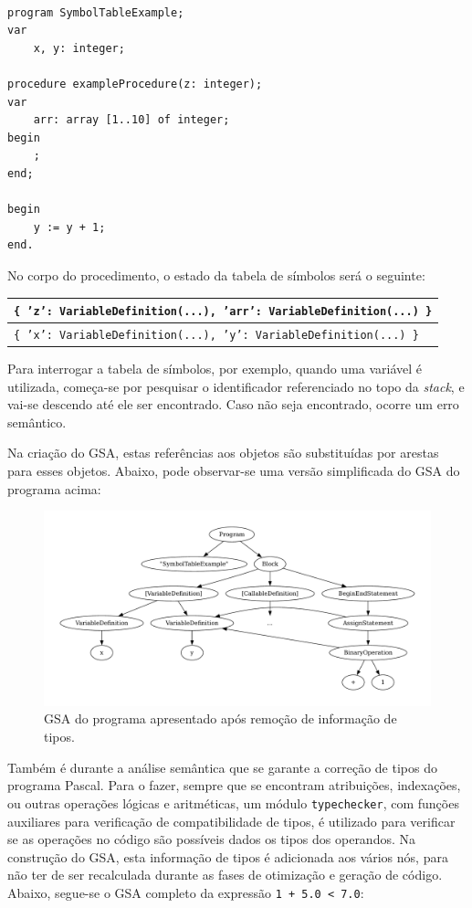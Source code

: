 \documentclass[12pt, a4paper]{article}
\begin{document}
\lstset{
    language=pascal
}

\begin{lstlisting}

program SymbolTableExample;
var
    x, y: integer;

procedure exampleProcedure(z: integer);
var
    arr: array [1..10] of integer;
begin
    ;
end;

begin
    y := y + 1;
end.
\end{lstlisting}

No corpo do procedimento, o estado da tabela de símbolos será o seguinte:

\begin{tabular}{|>{\centering\arraybackslash}p{\textwidth}|}
    \hline
    \texttt{\{ 'z': VariableDefinition(...), 'arr': VariableDefinition(...) \}} \\
    \hline
    \texttt{\{ 'x': VariableDefinition(...), 'y': VariableDefinition(...) \}} \\
    \hline
\end{tabular}

Para interrogar a tabela de símbolos, por exemplo, quando uma variável é utilizada, começa-se por
pesquisar o identificador referenciado no topo da \emph{stack}, e vai-se descendo até ele ser
encontrado. Caso não seja encontrado, ocorre um erro semântico.

Na criação do GSA, estas referências aos objetos são substituídas por arestas para esses objetos.
Abaixo, pode observar-se uma versão simplificada do GSA do programa acima:

\begin{figure}[H]
    \centering
    \includegraphics[width=\textwidth]{res/variable-reference.pdf}
    \caption{GSA do programa apresentado após remoção de informação de tipos.}
\end{figure}

Também é durante a análise semântica que se garante a correção de tipos do programa Pascal. Para o
fazer, sempre que se encontram atribuições, indexações, ou outras operações lógicas e aritméticas,
um módulo \texttt{typechecker}, com funções auxiliares para verificação de compatibilidade de tipos,
é utilizado para verificar se as operações no código são possíveis dados os tipos dos operandos.
Na construção do GSA, esta informação de tipos é adicionada aos vários nós, para não ter de ser
recalculada durante as fases de otimização e geração de código. Abaixo, segue-se o GSA completo da
expressão \texttt{1 + 5.0 < 7.0}:
\end{document}
